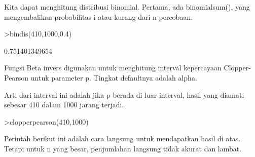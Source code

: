 \documentclass[a4paper,10pt]{article}
\begin{document}
\begin{eulernotebook}
\begin{eulercomment}
\begin{eulercomment}
\begin{eulercomment}
\begin{eulercomment}
\begin{eulercomment}
\begin{eulercomment}
\begin{eulercomment}
\begin{eulercomment}
\begin{eulercomment}
\begin{eulercomment}
\begin{eulercomment}
\begin{eulercomment}
\begin{eulercomment}
\begin{eulercomment}
\begin{eulercomment}
\begin{eulercomment}
\begin{eulercomment}
\begin{eulercomment}
\begin{eulercomment}
\begin{eulercomment}
\begin{eulercomment}
\begin{eulercomment}
\begin{eulercomment}
\begin{eulercomment}
\begin{eulercomment}
\begin{eulercomment}
\begin{eulercomment}
\begin{eulercomment}
\begin{eulercomment}
\begin{eulercomment}
\begin{eulercomment}
\begin{eulercomment}
\begin{eulercomment}
\begin{eulercomment}
\begin{eulercomment}
\begin{eulercomment}
\begin{eulercomment}
\begin{eulercomment}
\begin{eulercomment}
\begin{eulercomment}
\begin{eulercomment}
\begin{eulercomment}
\begin{eulercomment}
\begin{eulercomment}
\begin{eulercomment}
Kita dapat menghitung distribusi binomial. Pertama, ada binomialsum(),
yang mengembalikan probabilitas i atau kurang dari n percobaan.
\end{eulercomment}
\begin{eulerprompt}
>bindis(410,1000,0.4)
\end{eulerprompt}
\begin{euleroutput}
  0.751401349654
\end{euleroutput}
\begin{eulercomment}
Fungsi Beta invers digunakan untuk menghitung interval kepercayaan
Clopper-Pearson untuk parameter p. Tingkat defaultnya adalah alpha.

Arti dari interval ini adalah jika p berada di luar interval, hasil
yang diamati sebesar 410 dalam 1000 jarang terjadi.
\end{eulercomment}
\begin{eulerprompt}
>clopperpearson(410,1000)
\end{eulerprompt}
\begin{euleroutput}
  [0.37932,  0.441212]
\end{euleroutput}
\begin{eulercomment}
Perintah berikut ini adalah cara langsung untuk mendapatkan hasil di
atas. Tetapi untuk n yang besar, penjumlahan langsung tidak akurat dan
lambat.
\end{eulercomment}
\begin{eulerprompt}

\end{eulerprompt}
\end{eulercomment}
\end{eulercomment}
\end{eulercomment}
\end{eulercomment}
\end{eulercomment}
\end{eulercomment}
\end{eulercomment}
\end{eulercomment}
\end{eulercomment}
\end{eulercomment}
\end{eulercomment}
\end{eulercomment}
\end{eulercomment}
\end{eulercomment}
\end{eulercomment}
\end{eulercomment}
\end{eulercomment}
\end{eulercomment}
\end{eulercomment}
\end{eulercomment}
\end{eulercomment}
\end{eulercomment}
\end{eulercomment}
\end{eulercomment}
\end{eulercomment}
\end{eulercomment}
\end{eulercomment}
\end{eulercomment}
\end{eulercomment}
\end{eulercomment}
\end{eulercomment}
\end{eulercomment}
\end{eulercomment}
\end{eulercomment}
\end{eulercomment}
\end{eulercomment}
\end{eulercomment}
\end{eulercomment}
\end{eulercomment}
\end{eulercomment}
\end{eulercomment}
\end{eulercomment}
\end{eulercomment}
\end{eulercomment}
\end{eulernotebook}
\end{document}
